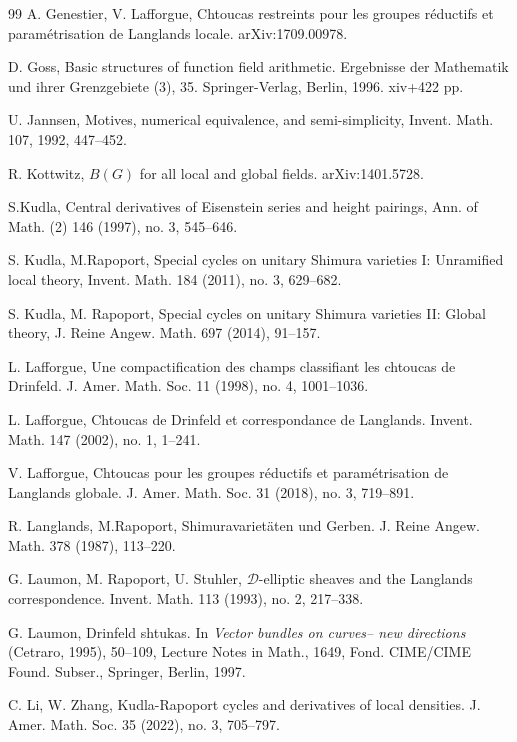 \documentclass[11pt]{amsart}
\numberwithin{equation}{section}
\theoremstyle{plain}
\theoremstyle{definition}
\newcommand\cD{\mathcal{D}}
\begin{document}
\begin{thebibliography}{99}
A. Genestier, V. Lafforgue,
Chtoucas restreints pour les groupes r\'eductifs et param\'etrisation de Langlands locale.
arXiv:1709.00978.

D. Goss, 
Basic structures of function field arithmetic.
Ergebnisse der Mathematik und ihrer Grenzgebiete (3), 35. Springer-Verlag, Berlin, 1996. xiv+422 pp.

U. Jannsen,
Motives, numerical equivalence, and semi-simplicity, 
Invent. Math. 107, 1992, 447--452.

R. Kottwitz,
$B(G)$ for all local and global fields.
arXiv:1401.5728.

S.Kudla,
Central derivatives of Eisenstein series and height pairings, 
Ann. of Math. (2) 146 (1997), no. 3, 545--646.

S. Kudla, M.Rapoport,
Special cycles on unitary Shimura varieties I: Unramified local theory, 
Invent. Math. 184 (2011), no. 3, 629--682.

S. Kudla, M. Rapoport, 
Special cycles on unitary Shimura varieties II: Global theory, 
J. Reine Angew. Math. 697 (2014), 91--157.

L. Lafforgue,
Une compactification des champs classifiant les chtoucas de Drinfeld. 
J. Amer. Math. Soc. 11 (1998), no. 4, 1001--1036.

L. Lafforgue,
Chtoucas de Drinfeld et correspondance de Langlands. 
Invent. Math. 147 (2002), no. 1, 1--241.


V. Lafforgue,
Chtoucas pour les groupes r\'eductifs et param\'etrisation de Langlands globale.
J. Amer. Math. Soc. 31 (2018), no. 3, 719--891.

 
R. Langlands, M.Rapoport,
Shimuravariet\"aten und Gerben. 
J. Reine Angew. Math. 378 (1987), 113--220.


G. Laumon, M. Rapoport, U. Stuhler,
$\cD$-elliptic sheaves and the Langlands correspondence.
Invent. Math. 113 (1993), no. 2, 217--338.


G. Laumon,
Drinfeld shtukas. 
In {\em Vector bundles on curves-- new directions} (Cetraro, 1995), 50--109, Lecture Notes in Math., 1649, Fond. CIME/CIME Found. Subser., Springer, Berlin, 1997.

C. Li, W. Zhang,
Kudla-Rapoport cycles and derivatives of local densities. 
J. Amer. Math. Soc. 35 (2022), no. 3, 705--797. 




\end{thebibliography}
\end{document}
